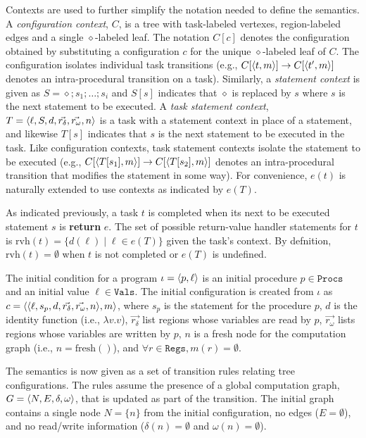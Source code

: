 Contexts are used to further simplify the notation needed to define the semantics.  A \emph{configuration context}, $C$, is a tree with task-labeled vertexes, region-labeled edges and a single $\diamond$-labeled leaf. The notation $C[c]$ denotes the configuration obtained by substituting a configuration $c$ for the unique $\diamond$-labeled leaf of $C$. The configuration isolates individual task transitions (e.g., $C[\langle t,m \rangle ] \rightarrow C[\langle t^\prime,m \rangle ]$ denotes an intra-procedural transition on a task). Similarly, a \emph{statement context} is given as $S = \diamond ; s_1; \dots ;s_i$ and $S[s]$ indicates that $\diamond$ is replaced by $s$ where $s$ is the next statement to be executed. A \emph{task statement context}, $T = \tuple{\ell,  S, d, \vec{r_\delta}, \vec{r_\omega}, n}$ is a task with a statement context in place of a statement, and likewise $T[s]$ indicates that $s$ is the next statement to be executed in the task. Like configuration contexts, task statement contexts isolate the statement to be executed (e.g., $C[\langle T[s_1],m \rangle ] \rightarrow C[\langle T[s_2],m \rangle ]$ denotes an intra-procedural transition that modifies the statement in some way). For convenience, $e(t)$ is naturally extended to use contexts as indicated by $e(T)$. 

As indicated previously, a task $t$ is completed when its next to be executed statement $s$ is \textbf{return} $e$. The set of possible return-value handler statements for $t$ is $\mathrm{rvh}(t) = \{d(\ell) \mid \ell \in e(T)\}$ given the task's context. By defnition, $\mathrm{rvh}(t) = \emptyset$ when $t$ is not completed or $e(T)$ is undefined. 

The initial condition for a program $\iota = \langle p, \ell \rangle $ is an initial procedure $p \in \texttt{Procs}$ and an initial value $\ell \in \texttt{Vals}$. The initial configuration is created from $\iota$ as $c = \tuple{\tuple{\ell, s_p, d, \vec{r_\delta}, \vec{r_\omega}, n}, m}$, where $s_p$ is the statement for the procedure $p$, $d$ is the identity function (i.e., $\lambda v.v$), $\vec{r_\delta}$ list regions whose variables are read by $p$, $\vec{r_\omega}$ lists regions whose variables are written by $p$, $n$ is a fresh node for the computation graph (i.e., $n = \mathrm{fresh}()$), and $\forall r \in \texttt{Regs}, m(r) = \emptyset$.

The semantics is now given as a set of transition rules relating tree configurations. The rules assume the presence of a global computation graph, $G = \langle N, E, \delta, \omega \rangle $, that is updated as part of the transition. The initial graph contains a single node $N = \{n\}$ from the initial configuration, no edges ($E = \emptyset$), and no read/write information ($\delta(n) = \emptyset$ and $\omega(n) = \emptyset$).

